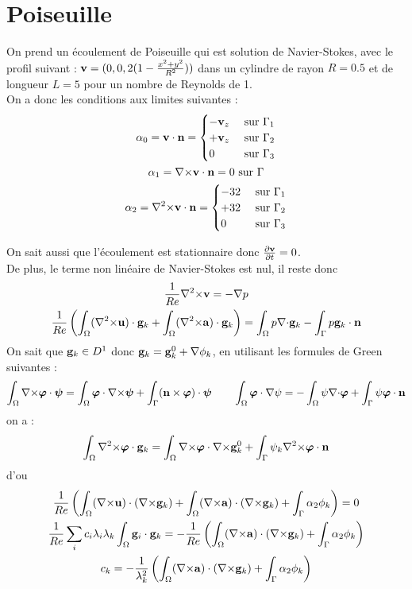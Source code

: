 \documentclass[a4paper,11pt]{article}
\begin{document}
\section{Poiseuille}
On prend un écoulement de Poiseuille qui est solution de Navier-Stokes, avec le profil suivant : ${\mathbf{v}} = (0,0, 2(1-\frac{x^2+y^2}{R^2}))$ dans un cylindre de rayon $R=0.5$ et de longueur $L=5$ pour un nombre de Reynolds de 1.\\
On a donc les conditions aux limites suivantes :
\begin{gather*}
  \alpha_0 = {\mathbf{v}}\cdot{\mathbf{n}} =
  \begin{cases}
    -{\mathbf{v}}_z & \mbox{ sur } \Gamma_1\\
    +{\mathbf{v}}_z & \mbox{ sur } \Gamma_2\\
    0 & \mbox{ sur } \Gamma_3
  \end{cases}\\
  \alpha_1 = {\nabla\times}{\mathbf{v}}\cdot{\mathbf{n}} = 0 \mbox{ sur } \Gamma\\
  \alpha_2 = {\nabla^2\times}{\mathbf{v}}\cdot{\mathbf{n}} =
  \begin{cases}
    -32 & \mbox{ sur } \Gamma_1\\
    +32 & \mbox{ sur } \Gamma_2\\
    0 & \mbox{ sur } \Gamma_3
  \end{cases}
\end{gather*}

On sait aussi que l'écoulement est stationnaire donc $\frac{\partial{\mathbf{v}}}{\partial t}=0$.\\
De plus, le terme non linéaire de Navier-Stokes est nul, il reste donc
\begin{gather}
  \frac{1}{Re}{\nabla^2\times}{\mathbf{v}}=-{\nabla} p\\
  \frac{1}{Re}\left( \int_\Omega({\nabla^2\times}{\mathbf{u}})\cdot{\mathbf{g}}_k  + \int_\Omega({\nabla^2\times}{\mathbf{a}})\cdot{\mathbf{g}}_k \right) = \int_\Omega p{\nabla\cdot}{\mathbf{g}}_k - \int_\Gamma p{\mathbf{g}}_k\cdot{\mathbf{n}}
\end{gather}
On sait que ${\mathbf{g}}_k\in D^1$ donc ${\mathbf{g}}_k={\mathbf{g}}_k^0 + {\nabla}\phi_k$,
en utilisant les formules de Green suivantes :
\[
\int_\Omega {\nabla\times}\bm{\varphi}\cdot\bm{\psi} = \int_\Omega \bm{\varphi}\cdot{\nabla\times}\bm{\psi} + \int_\Gamma ({\mathbf{n}}\times\bm{\varphi})\cdot\bm{\psi}\quad\quad
\int_\Omega \bm{\varphi}\cdot{\nabla}\psi = -\int_\Omega \psi{\nabla\cdot}\bm{\varphi} + \int_\Gamma \psi\bm{\varphi}\cdot{\mathbf{n}}
\]
on a :
\[
\int_\Omega {\nabla^2\times}\bm{\varphi}\cdot{\mathbf{g}}_k = \int_\Omega {\nabla\times}\bm{\varphi}\cdot{\nabla\times}{\mathbf{g}}_k^0 + \int_\Gamma \psi_k{\nabla^2\times}\bm{\varphi}\cdot{\mathbf{n}}
\]
d'ou
\begin{gather}
  \frac{1}{Re}\left( \int_\Omega({\nabla\times}{\mathbf{u}})\cdot({\nabla\times}{\mathbf{g}}_k)  + \int_\Omega({\nabla\times}{\mathbf{a}})\cdot({\nabla\times}{\mathbf{g}}_k) + \int_\Gamma \alpha_2\phi_k \right) = 0\\
  \frac{1}{Re}\sum_i c_i\lambda_i\lambda_k\int_\Omega {\mathbf{g}}_i\cdot{\mathbf{g}}_k = -\frac{1}{Re}\left( \int_\Omega ({\nabla\times}{\mathbf{a}})\cdot({\nabla\times}{\mathbf{g}}_k) + \int_\Gamma \alpha_2\phi_k \right)\\
  c_k = -\frac{1}{\lambda_k^2}\left( \int_\Omega ({\nabla\times}{\mathbf{a}})\cdot({\nabla\times}{\mathbf{g}}_k) + \int_\Gamma \alpha_2\phi_k \right)
\end{gather}
\end{document}
